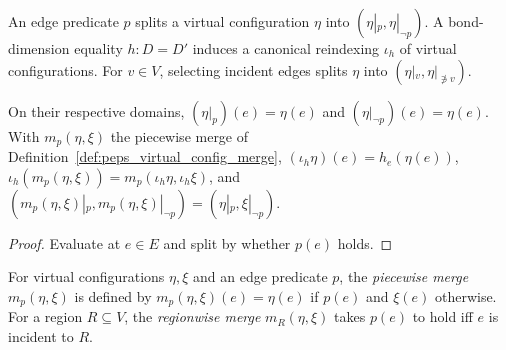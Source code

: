 \begin{definition}
    \label{def:peps_virtual_config_split_reindex}
    \leanok
    An edge predicate $p$ splits a virtual configuration $\eta$ into
    $(\eta|_p,\eta|_{\neg p})$. A bond-dimension equality $h:D=D'$ induces a
    canonical reindexing $\iota_h$ of virtual configurations. For $v\in V$,
    selecting incident edges splits $\eta$ into $(\eta|_v,\eta|_{\not\ni v})$.
\end{definition}

\begin{lemma}
    \label{thm:peps_virtual_config_split_reindex_apply}
    \leanok
    On their respective domains, $(\eta|_p)(e)=\eta(e)$ and
    $(\eta|_{\neg p})(e)=\eta(e)$. With $m_p(\eta,\xi)$ the piecewise merge of
    Definition~\ref{def:peps_virtual_config_merge},
    $(\iota_h\eta)(e)=h_e(\eta(e))$,
    $\iota_h(m_p(\eta,\xi))=m_p(\iota_h\eta,\iota_h\xi)$, and
    $(m_p(\eta,\xi)|_p,m_p(\eta,\xi)|_{\neg p})=(\eta|_p,\xi|_{\neg p})$.
\end{lemma}
\begin{proof}\leanok
    Evaluate at $e\in E$ and split by whether $p(e)$ holds.
\end{proof}

\begin{definition}
    \label{def:peps_virtual_config_merge}
    \leanok
    For virtual configurations $\eta,\xi$ and an edge predicate $p$, the
    \emph{piecewise merge} $m_p(\eta,\xi)$ is defined by
    $m_p(\eta,\xi)(e)=\eta(e)$ if $p(e)$ and $\xi(e)$ otherwise. For a region
    $R\subseteq V$, the \emph{regionwise merge} $m_R(\eta,\xi)$ takes $p(e)$ to
    hold iff $e$ is incident to $R$.
\end{definition}

